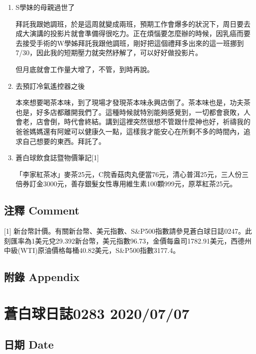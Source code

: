 \documentclass[a5paper, 11pt
]{book}
\begin{document}
\begin{enumerate}
\def\labelenumi{\arabic{enumi}.}
\item
  S學妹的母親過世了

  拜託我跟她調班，於是這周就變成兩班，預期工作會爆多的狀況下，周日要去成大演講的投影片就會準備得很吃力。正在煩惱要怎麼辦的時候，因乳癌而要去接受手術的W學姊拜託我跟他調班，剛好把這個禮拜多出來的這一班挪到7/30，因此我的短期壓力就突然紓解了，可以好好做投影片。

  但月底就會工作量大增了，不管，到時再說。
\item
  去預訂冷氣遙控器之後

  本來想要喝茶本味，到了現場才發現茶本味永興店倒了。茶本味也是，功夫茶也是，好多店都離開我們了。這種時候就特別能夠感覺到，一切都會衰敗，人會老，店會倒，時代會終結。講到這裡突然很想不管跟什麼神也好，祈禱我的爸爸媽媽還有阿嬤可以健康久一點，這樣我才能安心在所剩不多的時間內，追求自己想要的東西。拜託了。
\item
  蒼白球飲食誌暨物價筆記{[}1{]}

  「李家紅茶冰」麥茶25元，C院香菇肉丸便當76元，清心普洱25元，三人份三倍券訂金3000元，善存銀髮女性專用維生素100顆999元，原萃紅茶25元。
\end{enumerate}

\hypertarget{ux6ce8ux91cb-comment-31}{%
\subsection{注釋 Comment}\label{ux6ce8ux91cb-comment-31}}

{[}1{]}
新台幣計價。有關新台幣、美元指數、S\&P500指數請參見蒼白球日誌0247。此刻匯率為1美元兌29.392新台幣，美元指數96.73，金價每盎司1782.91美元，西德州中級(WTI)原油價格每桶40.82美元，S\&P500指數3177.4。

\hypertarget{ux9644ux9304-appendix-31}{%
\subsection{附錄 Appendix}\label{ux9644ux9304-appendix-31}}

\hypertarget{ux84bcux767dux7403ux65e5ux8a8c0283-20200707}{%
\section{蒼白球日誌0283
2020/07/07}\label{ux84bcux767dux7403ux65e5ux8a8c0283-20200707}}

\hypertarget{ux65e5ux671f-date-32}{%
\subsection{日期 Date}\label{ux65e5ux671f-date-32}}
\end{document}
